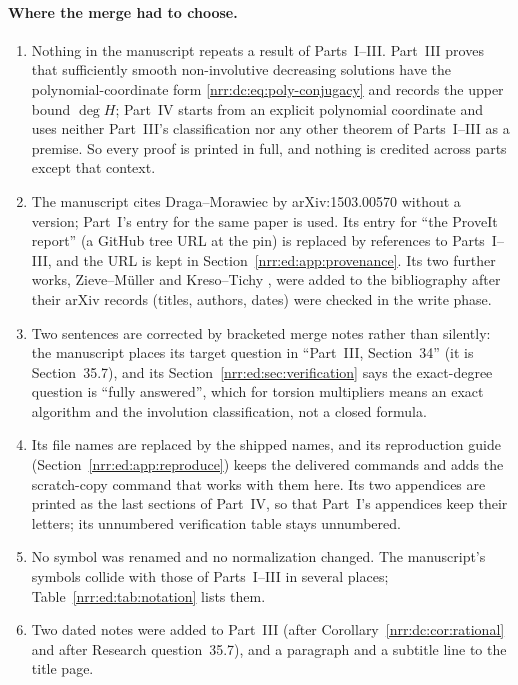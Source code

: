 \documentclass[11pt,letterpaper]{article}
\theoremstyle{definition}
\theoremstyle{remark}
\begin{document}
\paragraph{Where the merge had to choose.}
\begin{enumerate}[label=\textnormal{(\alph*)},leftmargin=2.2em]
\item Nothing in the manuscript repeats a result of Parts~I--III. Part~III
proves that sufficiently smooth non-involutive decreasing solutions have the
polynomial-coordinate form \eqref{nrr:dc:eq:poly-conjugacy} and records the
upper bound $\deg H$; Part~IV starts from an explicit polynomial coordinate
and uses neither Part~III's classification nor any other theorem of
Parts~I--III as a premise. So every proof is printed in full, and nothing
is credited across parts except that context.
\item The manuscript cites Draga--Morawiec by arXiv:1503.00570 without a
version; Part~I's entry for the same paper \cite{DM2016} is used. Its entry
for ``the ProveIt report'' (a GitHub tree URL at the pin) is replaced by
references to Parts~I--III, and the URL is kept in
Section~\ref{nrr:ed:app:provenance}. Its two further works,
Zieve--M\"uller \cite{ZM2008} and Kreso--Tichy \cite{KT2016}, were added to
the bibliography after their arXiv records (titles, authors, dates) were
checked in the write phase.
\item Two sentences are corrected by bracketed merge notes rather than
silently: the manuscript places its target question in ``Part~III,
Section~34'' (it is Section~35.7), and its Section~\ref{nrr:ed:sec:verification}
says the exact-degree question is ``fully answered'', which for torsion
multipliers means an exact algorithm and the involution classification, not a
closed formula.
\item Its file names are replaced by the shipped names, and its reproduction
guide (Section~\ref{nrr:ed:app:reproduce}) keeps the delivered commands and
adds the scratch-copy command that works with them here. Its two appendices
are printed as the last sections of Part~IV, so that Part~I's appendices keep
their letters; its unnumbered verification table stays unnumbered.
\item No symbol was renamed and no normalization changed. The manuscript's
symbols collide with those of Parts~I--III in several places;
Table~\ref{nrr:ed:tab:notation} lists them.
\item Two dated notes were added to Part~III (after
Corollary~\ref{nrr:dc:cor:rational} and after Research question~35.7), and a
paragraph and a subtitle line to the title page.
\end{enumerate}
\end{document}
